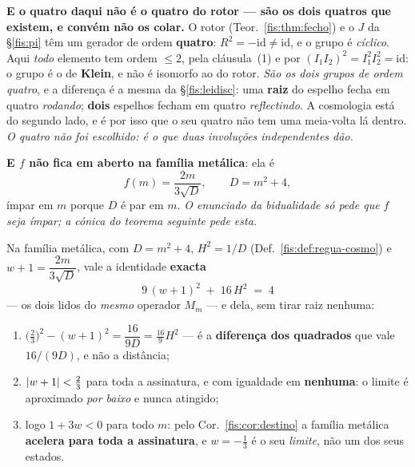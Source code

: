 \documentclass[livro.tex]{subfiles}
\begin{document}
\medskip\noindent\textbf{E o quatro daqui não é o quatro do rotor --- são os dois
quatros que existem, e convém não os colar.} O rotor
(Teor.~\ref{fis:thm:fecho}) e o $J$ da §\ref{fis:pi} têm um gerador de ordem
\textbf{quatro}: $R^{2}=-\mathrm{id}\neq\mathrm{id}$, e o grupo é \emph{cíclico}.
Aqui \emph{todo} elemento tem ordem $\le2$, pela cláusula~(1) e por
$(I_1I_2)^{2}=I_1^{2}I_2^{2}=\mathrm{id}$: o grupo é o de \textbf{Klein}, e não é
isomorfo ao do rotor. \emph{São os dois grupos de ordem quatro}, e a diferença é
a mesma da §\ref{fis:leidisc}: uma \textbf{raiz} do espelho fecha em quatro
\emph{rodando}; \textbf{dois} espelhos fecham em quatro \emph{reflectindo}. A
cosmologia está do segundo lado, e é por isso que o seu quatro não tem uma
meia-volta lá dentro. \emph{O quatro não foi escolhido: é o que duas involuções
independentes dão.}

\medskip\noindent\textbf{E $f$ não fica em aberto na família metálica}: ela é
\[
f(m)=\frac{2m}{3\sqrt{D}},\qquad D=m^{2}+4 ,
\]
ímpar em $m$ porque $D$ é par em $m$. \emph{O enunciado da bidualidade só pede
que $f$ seja ímpar; a cónica do teorema seguinte pede esta.}

\begin{teorema}\label{fis:thm:conica}
Na família metálica, com $D=m^{2}+4$, $H^{2}=1/D$
(Def.~\ref{fis:def:regua-cosmo}) e $w+1=\dfrac{2m}{3\sqrt D}$, vale a identidade
\textbf{exacta}
\[
\boxed{\;9\,(w+1)^{2}\;+\;16\,H^{2}\;=\;4\;}
\]
--- os dois lidos do \emph{mesmo} operador $M_m$ --- e dela, sem tirar raiz
nenhuma:
\begin{enumerate}\itemsep3pt
\item[(1)] $\bigl(\tfrac23\bigr)^{2}-(w+1)^{2}=\dfrac{16}{9D}=\tfrac{16}{9}H^{2}$
--- é a \textbf{diferença dos quadrados} que vale $16/(9D)$, e não a distância;
\item[(2)] $\lvert w+1\rvert<\tfrac23$ para toda a assinatura, e com igualdade em
\textbf{nenhuma}: o limite é aproximado \emph{por baixo} e nunca atingido;
\item[(3)] logo $1+3w<0$ para todo $m$: pelo Cor.~\ref{fis:cor:destino} a família
metálica \textbf{acelera para toda a assinatura}, e $w=-\tfrac13$ é o seu
\emph{limite}, não um dos seus estados.
\end{enumerate}
\end{teorema}
\end{document}
